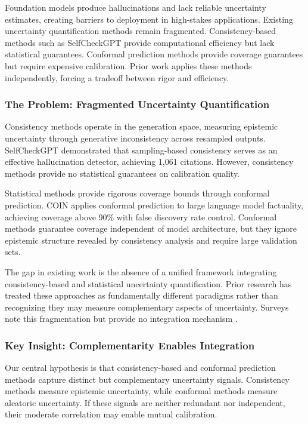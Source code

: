 
Foundation models produce hallucinations and lack reliable uncertainty estimates, creating barriers to deployment in high-stakes applications. Existing uncertainty quantification methods remain fragmented. Consistency-based methods such as SelfCheckGPT provide computational efficiency but lack statistical guarantees. Conformal prediction methods provide coverage guarantees but require expensive calibration. Prior work applies these methods independently, forcing a tradeoff between rigor and efficiency.

\subsubsection{The Problem: Fragmented Uncertainty Quantification}

Consistency methods operate in the generation space, measuring epistemic uncertainty through generative inconsistency across resampled outputs. SelfCheckGPT \citep{manakul2023selfcheckgpt} demonstrated that sampling-based consistency serves as an effective hallucination detector, achieving 1,061 citations. However, consistency methods provide no statistical guarantees on calibration quality.

Statistical methods provide rigorous coverage bounds through conformal prediction. COIN \citep{wang2025coin} applies conformal prediction to large language model factuality, achieving coverage above 90\% with false discovery rate control. Conformal methods guarantee coverage independent of model architecture, but they ignore epistemic structure revealed by consistency analysis and require large validation sets.

The gap in existing work is the absence of a unified framework integrating consistency-based and statistical uncertainty quantification. Prior research has treated these approaches as fundamentally different paradigms rather than recognizing they may measure complementary aspects of uncertainty. Surveys note this fragmentation but provide no integration mechanism \citep{kang2025uq_survey}.

\subsubsection{Key Insight: Complementarity Enables Integration}

Our central hypothesis is that consistency-based and conformal prediction methods capture distinct but complementary uncertainty signals. Consistency methods measure epistemic uncertainty, while conformal methods measure aleatoric uncertainty. If these signals are neither redundant nor independent, their moderate correlation may enable mutual calibration.

